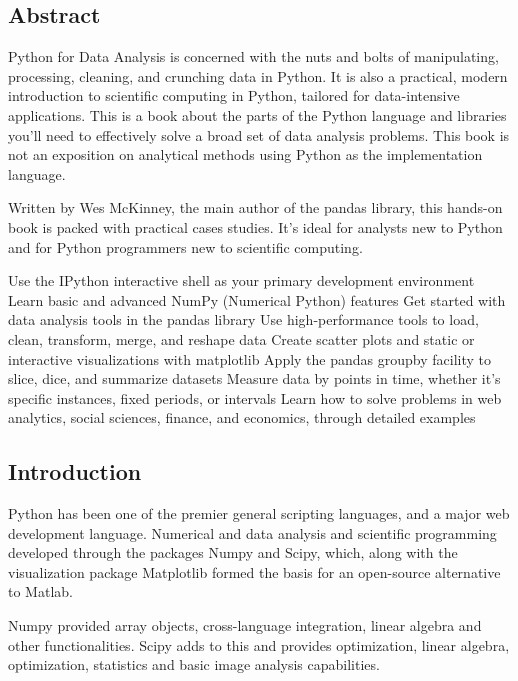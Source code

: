 
\subsection*{Abstract}
Python for Data Analysis is concerned with the nuts and bolts of manipulating, processing, cleaning, and crunching data in Python. It is also a practical, modern introduction to scientific computing in Python, tailored for data-intensive applications. This is a book about the parts of the Python language and libraries you’ll need to effectively solve a broad set of data analysis problems. This book is not an exposition on analytical methods using Python as the implementation language.

Written by Wes McKinney, the main author of the pandas library, this hands-on book is packed with practical cases studies. It’s ideal for analysts new to Python and for Python programmers new to scientific computing.

Use the IPython interactive shell as your primary development environment
Learn basic and advanced NumPy (Numerical Python) features
Get started with data analysis tools in the pandas library
Use high-performance tools to load, clean, transform, merge, and reshape data
Create scatter plots and static or interactive visualizations with matplotlib
Apply the pandas groupby facility to slice, dice, and summarize datasets
Measure data by points in time, whether it’s specific instances, fixed periods, or intervals
Learn how to solve problems in web analytics, social sciences, finance, and economics, through detailed examples

\subsection*{Introduction}

Python has been one of the premier general scripting languages, and a major web development language. 
Numerical and data analysis and scientific programming developed through the packages Numpy and Scipy, 
which, along with the visualization package Matplotlib formed the basis for an open-source alternative to Matlab. 

Numpy provided array objects, cross-language integration, linear algebra and other functionalities. 
Scipy adds to this and provides optimization, linear algebra, optimization, statistics and basic image analysis 
capabilities. 

